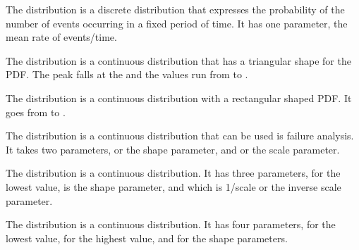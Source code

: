 
The  distribution is a discrete distribution that
expresses the probability of the number of events occurring in a fixed
period of time.  It has one parameter,  the mean rate
of events/time.


The  distribution is a continuous distribution
that has a triangular shape for the PDF.  The peak falls at the
 and the values run from  to
.


The  distribution is a continuous distribution with
a rectangular shaped PDF.  It goes from  to
.


The  distribution is a continuous distribution that
can be used is failure analysis.  It takes two parameters,
 or the shape parameter, and  or the
scale parameter.


The  distribution is a continuous distribution.  It
has three parameters,  for the lowest value,
 is the shape parameter, and  which
is 1/scale or the inverse scale parameter.


The  distribution is a continuous distribution.  It has
four parameters,  for the lowest value,
 for the highest value,  and
 for the shape parameters.
